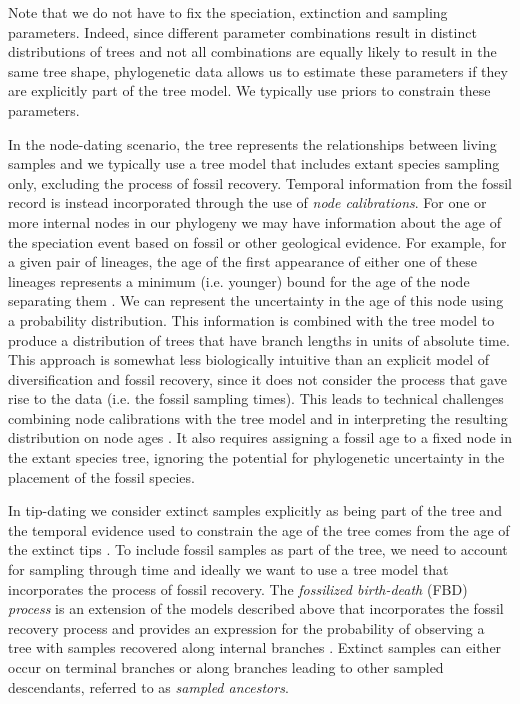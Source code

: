 \documentclass[11pt]{article}
\begin{document}
Note that we do not have to fix the speciation, extinction and sampling parameters. 
Indeed, since different parameter combinations result in distinct distributions of trees and not all combinations are equally likely to result in the same tree shape, phylogenetic data  allows us to estimate these parameters if they are explicitly part of the tree model. 
We typically use priors to constrain these parameters.

In the node-dating scenario, the tree represents the relationships between living samples and we typically use a tree model that includes extant species sampling only, excluding the process of fossil recovery.
Temporal information from the fossil record is instead incorporated through the use of \textit{node calibrations}. 
For one or more internal nodes in our phylogeny we may have information about the age of the speciation event based on fossil or other geological evidence.
For example, for a given pair of lineages, the age of the first appearance of either one of these lineages represents a minimum (i.e. younger) bound for the age of the node separating them \cite{Parham2012}.
We can represent the uncertainty in the age of this node using a probability distribution. %
This information is combined with the tree model to produce a distribution of trees that have branch lengths in units of absolute time.
This approach is somewhat less biologically intuitive than an explicit model of diversification and fossil recovery, since it does not consider the process that gave rise to the data (i.e. the fossil sampling times).
This leads to technical challenges combining node calibrations with the tree model and in interpreting the resulting distribution on node ages \cite{Heled2012,Warnock2015}.
It also requires assigning a fossil age to a fixed node in the extant species tree, ignoring the potential for phylogenetic uncertainty in the placement of the fossil species.

In tip-dating we consider extinct samples explicitly as being part of the tree and the temporal evidence used to constrain the age of the tree comes from the age of the extinct tips \cite{Ronquist2012a}.
To include fossil samples as part of the tree, we need to account for sampling through time and ideally we want to use a tree model that incorporates the process of fossil recovery.
The \textit{fossilized birth-death} (FBD) \textit{process} is an extension of the models described above that incorporates the fossil recovery process and provides an expression for the probability of observing a tree with samples recovered along internal branches \cite{Stadler2010,Heath2014,Gavryushkina2014}.
Extinct samples can either occur on terminal branches or along branches leading to other sampled descendants, referred to as \textit{sampled ancestors}.
\end{document}
